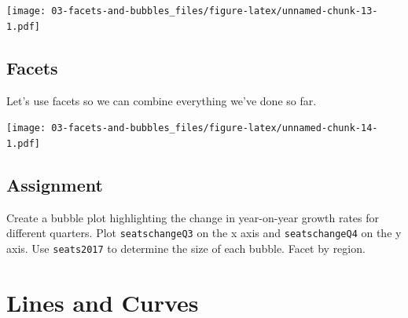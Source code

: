 \documentclass[]{book}
\newenvironment{Shaded}{\begin{snugshade}}{\end{snugshade}}
\newcommand{\KeywordTok}[1]{\textcolor[rgb]{0.13,0.29,0.53}{\textbf{{#1}}}}
\newcommand{\DataTypeTok}[1]{\textcolor[rgb]{0.13,0.29,0.53}{{#1}}}
\newcommand{\DecValTok}[1]{\textcolor[rgb]{0.00,0.00,0.81}{{#1}}}
\newcommand{\FloatTok}[1]{\textcolor[rgb]{0.00,0.00,0.81}{{#1}}}
\newcommand{\StringTok}[1]{\textcolor[rgb]{0.31,0.60,0.02}{{#1}}}
\newcommand{\NormalTok}[1]{{#1}}
\theoremstyle{definition}
\theoremstyle{definition}
\theoremstyle{remark}
\begin{document}
\texttt{[image: 03-facets-and-bubbles\_files/figure-latex/unnamed-chunk-13-1.pdf]}

\section{Facets}\label{facets-1}

Let's use facets so we can combine everything we've done so far.

\begin{Shaded}
\end{Shaded}

\texttt{[image: 03-facets-and-bubbles\_files/figure-latex/unnamed-chunk-14-1.pdf]}

\section{Assignment}\label{assignment-2}

Create a bubble plot highlighting the change in year-on-year growth
rates for different quarters. Plot \texttt{seatschangeQ3} on the x axis
and \texttt{seatschangeQ4} on the y axis. Use \texttt{seats2017} to
determine the size of each bubble. Facet by region.

\hypertarget{lines}{\chapter{Lines and Curves}\label{lines}}
\end{document}
